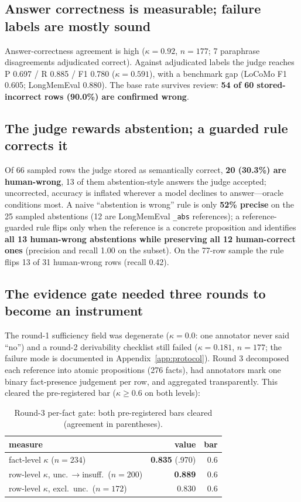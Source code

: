 \documentclass[11pt]{article}
\begin{document}
\subsection{Answer correctness is measurable; failure labels are mostly sound}

Answer-correctness agreement is high ($\kappa = 0.92$, $n = 177$; 7 paraphrase
disagreements adjudicated correct). Against adjudicated labels the judge
reaches P 0.697 / R 0.885 / F1 0.780 ($\kappa = 0.591$), with a benchmark gap
(LoCoMo F1 0.605; LongMemEval 0.880). The base rate survives review:
\textbf{54 of 60 stored-incorrect rows (90.0\%) are confirmed wrong}.

\subsection{The judge rewards abstention; a guarded rule corrects it}

Of 66 sampled rows the judge stored as semantically correct, \textbf{20
(30.3\%) are human-wrong}, 13 of them abstention-style answers the judge
accepted; uncorrected, accuracy is inflated wherever a model declines to answer---oracle
conditions most. A naive ``abstention is wrong''
rule is only \textbf{52\% precise} on the 25 sampled abstentions (12 are
LongMemEval \texttt{\_abs} references); a reference-guarded rule flips only
when the reference is a concrete proposition and identifies \textbf{all 13
human-wrong abstentions while preserving all 12 human-correct ones} (precision
and recall 1.00 on the subset). On the 77-row sample the rule flips 13 of 31
human-wrong rows (recall 0.42).

\subsection{The evidence gate needed three rounds to become an instrument}

The round-1 sufficiency field was degenerate ($\kappa = 0.0$: one annotator
never said ``no'') and a round-2 derivability checklist still failed
($\kappa = 0.181$, $n = 177$; the failure mode is documented in
Appendix~\ref{app:protocol}). Round 3 decomposed each reference into atomic
propositions (276 facts), had annotators mark one binary fact-presence
judgement per row, and aggregated transparently. This cleared the
pre-registered bar ($\kappa \geq 0.6$ on both levels):

\begin{table}[t]
\centering
\footnotesize
\setlength{\tabcolsep}{3pt}
\begin{tabular}{@{}lrr@{}}
\toprule
measure & value & bar \\
\midrule
fact-level $\kappa$ ($n{=}234$) & \textbf{0.835} (.970) & 0.6 \\
row-level $\kappa$, unc.\,$\to$insuff.\ ($n{=}200$) & \textbf{0.889} & 0.6 \\
row-level $\kappa$, excl.\ unc.\ ($n{=}172$) & 0.830 & 0.6 \\
\bottomrule
\end{tabular}
\caption{Round-3 per-fact gate: both pre-registered bars cleared
(agreement in parentheses).}
\label{tab:gate}
\end{table}
\end{document}
